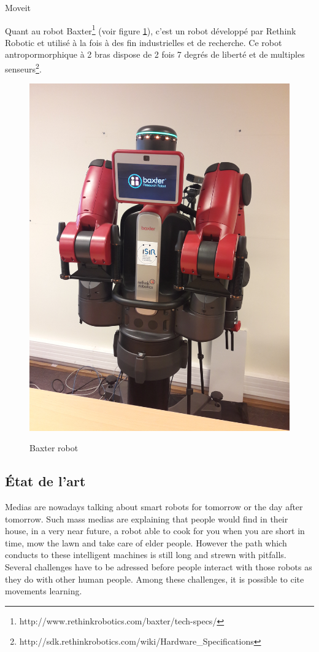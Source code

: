 \documentclass{llncs}
\begin{document}
Moveit

Quant au robot Baxter\footnote{http://www.rethinkrobotics.com/baxter/tech-specs/} (voir figure \ref{fig:baxter}), c'est un robot développé par Rethink Robotic et utilisé à la fois à des fin industrielles et de recherche. Ce robot antropormorphique à 2 bras dispose de 2 fois 7 degrés de liberté et de multiples  senseurs\footnote{http://sdk.rethinkrobotics.com/wiki/Hardware\_Specifications}.

\begin{figure}
	\centering
	\includegraphics[angle=-90,width=.5\textwidth]{figures/baxter}
	\label{fig:baxter}
	\caption{Baxter robot}
\end{figure}


\subsection{\'Etat de l'art}

Medias are nowadays talking about smart robots for tomorrow or the day after tomorrow. Such mass medias are explaining that people would find in their house, in a very near future,  a robot able to cook for you when you are short in time, mow the lawn and take care of elder people. However the path which conducts to these intelligent machines is still long and strewn with pitfalls. Several challenges have to be adressed before people interact with those robots as they do with other human people. Among these challenges, it is possible to cite movements learning.
\end{document}
